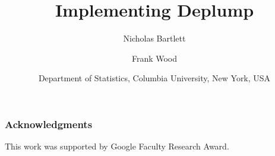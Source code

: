 \documentclass[oneside,letterpaper,12pt]{article}
\title{Implementing Deplump}
\author{Nicholas Bartlett  \and Frank Wood}
\date{
\small Department of Statistics, Columbia University, New York, USA}
\begin{document}
\maketitle









%

%

%

%

%

\subsubsection*{Acknowledgments}
This work was supported by Google Faculty Research Award.

\renewcommand{\bibsection}{\subsubsection*{References}}
\setlength{\bibsep}{0mm}


\end{document}

